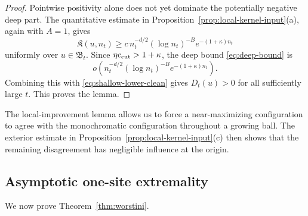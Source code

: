 \documentclass[letterpaper,11pt,reqno]{amsart}
\theoremstyle{definition}
\newcommand{\IK}{\mathfrak{K}}
\begin{document}
\begin{proof}
Pointwise positivity alone does not yet dominate the potentially negative deep part. The
quantitative estimate in Proposition~\ref{prop:local-kernel-input}(a), again with \(A=1\), gives
\[
\IK(u,n_t)
\ge
c\,n_t^{-d/2}(\log n_t)^{-B}e^{-(1+\kappa)n_t}
\]
uniformly over \(u\in\mathfrak B_t\). Since \(\eta c_{\rm cut}>1+\kappa\), the deep bound
\eqref{eq:deep-bound} is
\[
o\!\left(
n_t^{-d/2}(\log n_t)^{-B}e^{-(1+\kappa)n_t}
\right).
\]
Combining this with \eqref{eq:shallow-lower-clean} gives \(D_t(u)>0\) for all sufficiently large
\(t\). This proves the lemma.
\end{proof}











The local-improvement lemma allows us to force a near-maximizing configuration to agree with the
monochromatic configuration throughout a growing ball. The exterior estimate in
Proposition~\ref{prop:local-kernel-input}(c) then shows that the remaining disagreement has
negligible influence at the origin.





\subsection{Asymptotic one-site extremality}
We now prove Theorem~\ref{thm:worstini}.
\end{document}
